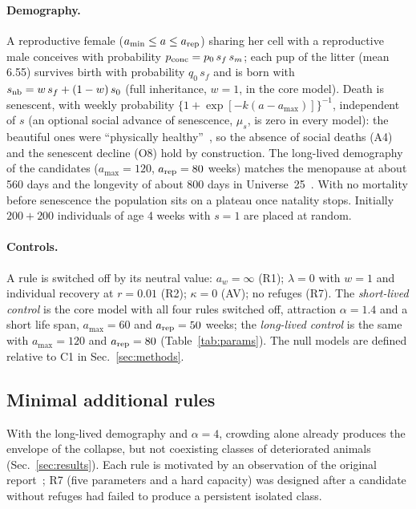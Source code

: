 \paragraph*{Demography.}
A reproductive female ($a_{\min}\le a\le a_{\rm rep}$) sharing her cell with a reproductive male conceives with
probability $p_{\rm conc}=p_0\,s_f\,s_m$; each pup of the litter (mean 6.55) survives birth with probability $q_0\,s_f$
and is born with $s_{\rm nb}=w\,s_f+(1-w)\,s_0$ (full inheritance, $w=1$, in the core model). Death is senescent, with
weekly probability $\{1+\exp[-k(a-a_{\max})]\}^{-1}$, independent of $s$ (an optional social advance of
senescence, $\mu_s$, is zero in every model): the beautiful ones were ``physically
healthy''~\cite{Calhoun1973}, so the absence of social deaths (A4) and the senescent decline (O8) hold by
construction. The long-lived demography of the candidates ($a_{\max}=120$, $a_{\rm rep}=80$ weeks) matches the menopause at about 560
days and the longevity of about 800 days in Universe~25~\cite{Calhoun1973}. With no mortality before senescence the
population sits on a plateau once natality stops. Initially $200+200$ individuals of age 4 weeks with $s=1$ are placed at random.

\paragraph*{Controls.}
A rule is switched off by its neutral value: $a_w=\infty$ (R1); $\lambda=0$ with $w=1$ and individual recovery at
$r=0.01$ (R2); $\kappa=0$ (AV); no refuges (R7). The \emph{short-lived control} is the core model with all four rules
switched off, attraction $\alpha=1.4$ and a short life span, $a_{\max}=60$ and $a_{\rm rep}=50$ weeks; the
\emph{long-lived control} is the same with $a_{\max}=120$ and $a_{\rm rep}=80$ (Table~\ref{tab:params}). The null
models are defined relative to \textsf{C1} in Sec.~\ref{sec:methods}.

\subsection{Minimal additional rules}
\label{sec:model-rules}

With the long-lived demography and $\alpha=4$, crowding alone already produces the envelope of the collapse, but not
coexisting classes of deteriorated animals (Sec.~\ref{sec:results}). Each rule is motivated by an observation of the
original report~\cite{Calhoun1973}; R7 (five parameters and a hard capacity) was designed after a candidate without
refuges had failed to produce a persistent isolated class.


